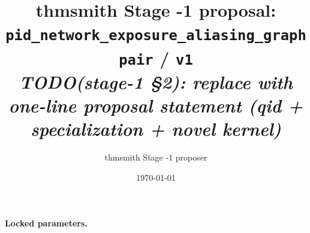 \documentclass[11pt]{article}
\title{thmsmith Stage -1 proposal: \texttt{pid\_network\_exposure\_aliasing\_graphpair} / \texttt{v1}%
  \\ \large\textit{TODO(stage-1 \S2): replace with one-line proposal statement (qid + specialization + novel kernel)}}
\author{thmsmith Stage -1 proposer}
\date{\today}
\theoremstyle{definition}
\theoremstyle{plain}
\theoremstyle{remark}
\begin{document}
\maketitle


\paragraph{Locked parameters.}

\begin{abstract}
\end{abstract}
\end{document}

